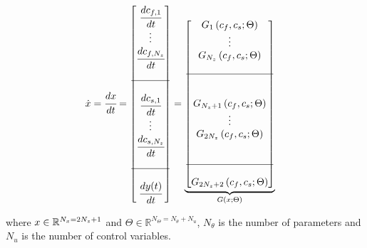\documentclass[a4paper,fleqn]{cas-dc}
\begin{document}
		{\footnotesize
			\begin{align*} \label{discretization}
				\dot{x} &= \cfrac{d x}{d t} = 
				\begin{bmatrix}
					\cfrac{d c_{f,1}}{d t} 	  \\
					\vdots		\\	
					\cfrac{d c_{f,N_z}}{d t} \\
					\\ \hline  	\\
					\cfrac{d c_{s,1}}{d t} 	  \\
					\vdots		\\
					\cfrac{d c_{s,N_z}}{d t} \\
					\\ \hline \\
					\cfrac{d {\color{black}y}(t)}{d t}
				\end{bmatrix}
				=
				\underbrace{\begin{bmatrix}
						G_1 \left( c_f,c_s; \Theta \right)\\ 
						\vdots\\ 
						G_{N_z} \left( c_f,c_s; \Theta \right)\\ 
						\\ \hline \\ \\
						G_{N_z+1} \left( c_f,c_s; \Theta \right)\\ 
						\vdots\\
						G_{2N_z} \left( c_f,c_s; \Theta \right)\\ 
						\\ \\ \hline \\
						G_{2N_z+2} \left( c_f,c_s; \Theta \right) 
				\end{bmatrix}}_{G \left( x; \Theta \right)} 
		\end{align*} }
		
		where ${\color{black}x} \in \mathbb{R}^{N_x = 2N_z+1} $ and $\Theta \in \mathbb{R}^{N_\Theta =  N_{\theta} + N_u } $, $N_{\theta}$ is the number of parameters and $N_{u}$ is the number of control variables.
		
\end{document}

